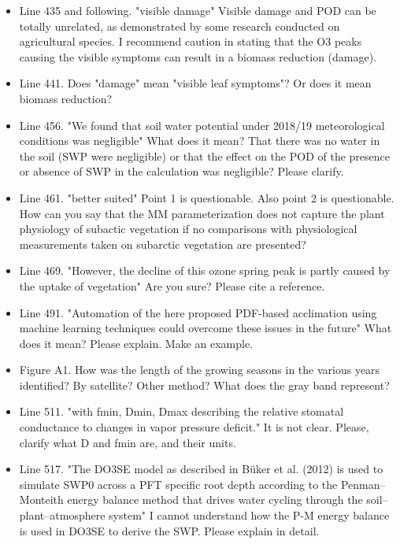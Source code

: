 \documentclass{scrartcl}
\begin{document}
\begin{itemize}
\item {\color{blue}Line 435 and following. "visible damage"
Visible damage and POD can be totally unrelated, as demonstrated by some research
conducted on agricultural species. I recommend caution in stating that the O3 peaks
causing the visible symptoms can result in a biomass reduction (damage).}

\item {\color{blue}Line 441. Does "damage" mean "visible leaf symptoms"? Or does it mean biomass reduction?}

\item {\color{blue}Line 456. "We found that soil water potential under 2018/19 meteorological conditions was negligible" What does it mean? That there was no water in the soil (SWP were negligible) or that the effect on the POD of the presence or absence of SWP in the calculation was negligible? Please clarify.}

\item {\color{blue}Line 461. "better suited" Point 1 is questionable.
Also point 2 is questionable. How can you say that the MM parameterization does not
capture the plant physiology of subactic vegetation if no comparisons with physiological measurements taken on subarctic vegetation are presented?}

\item {\color{blue}Line 469. "However, the decline of this ozone spring peak is partly caused by the uptake of vegetation" Are you sure? Please cite a reference.}

\item {\color{blue}Line 491. "Automation of the here proposed PDF-based acclimation using machine learning techniques could overcome these issues in the future"
What does it mean? Please explain. Make an example.}

\item {\color{blue}Figure A1. How was the length of the growing seasons in the various years identified? By satellite? Other method? What does the gray band represent?}

\item {\color{blue}Line 511. "with fmin, Dmin, Dmax describing the relative stomatal conductance to changes in vapor pressure deficit." It is not clear. Please, clarify what D and fmin are, and their units.}

\item {\color{blue}Line 517. "The DO3SE model as described in Büker et al. (2012) is used to simulate SWP0 across a PFT specific root depth according to the Penman--Monteith energy balance method that drives water cycling through the soil--plant--atmosphere system" I cannot understand how the P-M energy balance is used in DO3SE to derive the SWP. Please explain in detail.}


\end{itemize}
\end{document}
